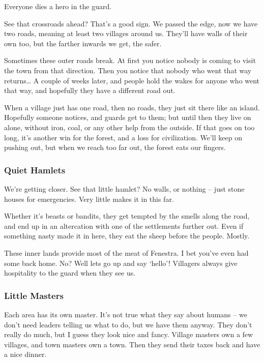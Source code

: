 \begin{multicols}{2}
\begin{exampletext}
  Everyone dies a hero in the \gls{guard}.

  See that crossroads ahead?
  That's a good sign.
  We passed the \gls{edge}, now we have two roads, meaning at least two villages around us.
  They'll have walls of their own too, but the farther inwards we get, the safer.

  Sometimes these outer roads break.
  At first you notice nobody is coming to visit the town from that direction.
  Then you notice that nobody who went that way returns\ldots
  A couple of weeks later, and people hold the wakes for anyone who went that way, and hopefully they have a different road out.

  When a village just has one road, then no roads, they just sit there like an island.
  Hopefully someone notices, and \glspl{guard} get to them; but until then they live on alone, without iron, coal, or any other help from the outside.
  If that goes on too long, it's another win for the forest, and a loss for civilization.
  We'll keep on pushing out, but when we reach too far out, the forest eats our fingers.

  \subsubsection*{Quiet Hamlets}

  We're getting closer.
  See that little hamlet?
  No walls, or nothing -- just stone houses for emergencies.
  Very little makes it in this far.

  Whether it's beasts or bandits, they get tempted by the smells along the road, and end up in an altercation with one of the settlements further out.
  Even if something nasty made it in here, they eat the sheep before the people.
  Mostly.

  These inner lands provide most of the meat of Fenestra.
  I bet you've even had some back home.
  No?
  Well lets go up and say `hello'!
  Villagers always give hospitality to the \gls{guard} when they see us.

  \subsubsection*{Little Masters}

  Each area has its own master.
  It's not true what they say about humans -- we don't need leaders telling us what to do, but we have them anyway.
  They don't really do much, but I guess they look nice and fancy.
  Village masters own a few villages, and town masters own a town.
  Then they send their taxes back and have a nice dinner.


\end{exampletext}
\end{multicols}
